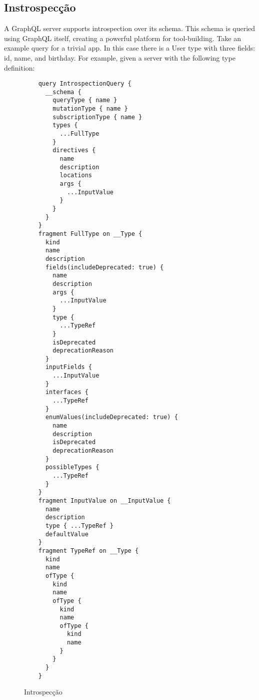 \subsection[Instrospecção]{Instrospecção}

A GraphQL server supports introspection over its schema. This schema is queried using GraphQL itself, creating a powerful platform for tool‐building. Take an example query for a trivial app. In this case there is a User type with three fields: id, name, and birthday. For example, given a server with the following type definition:

\begin{figure}[H]
  \centering
  \begin{verbatim}
    query IntrospectionQuery {
      __schema {
        queryType { name }
        mutationType { name }
        subscriptionType { name }
        types {
          ...FullType
        }
        directives {
          name
          description
          locations
          args {
            ...InputValue
          }
        }
      }
    }
    fragment FullType on __Type {
      kind
      name
      description
      fields(includeDeprecated: true) {
        name
        description
        args {
          ...InputValue
        }
        type {
          ...TypeRef
        }
        isDeprecated
        deprecationReason
      }
      inputFields {
        ...InputValue
      }
      interfaces {
        ...TypeRef
      }
      enumValues(includeDeprecated: true) {
        name
        description
        isDeprecated
        deprecationReason
      }
      possibleTypes {
        ...TypeRef
      }
    }
    fragment InputValue on __InputValue {
      name
      description
      type { ...TypeRef }
      defaultValue
    }
    fragment TypeRef on __Type {
      kind
      name
      ofType {
        kind
        name
        ofType {
          kind
          name
          ofType {
            kind
            name
          }
        }
      }
    }
  \end{verbatim}
  \caption{Introspecção}
\end{figure}
